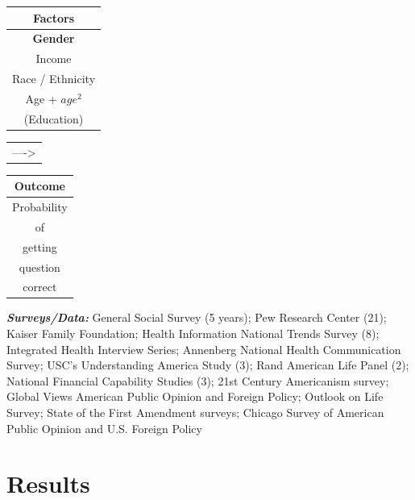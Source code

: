 \documentclass[]{article}
\begin{document}
 \begin{table}[ht]
 \centering
     \begin{tabular}{c}  %
       \hline   %
       Factors          \\
       \hline   %
       \textbf{Gender}           \\
       Income           \\
       Race / Ethnicity \\
       Age + $age^2$    \\
       (Education)        \\
       \hline  %
     \end{tabular}
     \begin{tabular}{l}  %
       ---->
     \end{tabular}
     \begin{tabular}{c}  %
        \hline   %
        Outcome        \\
        \hline   %
        Probability      \\
        of     \\
        getting \\
        question     \\
        correct          \\
        \hline  %
      \end{tabular}
 \end{table}

\vspace{7mm}

 \emph{\textbf{Surveys/Data:}} \footnotesize{General Social Survey (5 years); Pew Research Center (21); Kaiser Family Foundation; Health Information National Trends Survey (8); Integrated Health Interview Series; Annenberg National Health Communication Survey; USC's Understanding America Study (3); Rand American Life Panel (2); National Financial Capability Studies (3); 21st Century Americanism survey; Global Views American Public Opinion and Foreign Policy; Outlook on Life Survey; State of the First Amendment surveys; Chicago Survey of American Public Opinion and U.S. Foreign Policy}

\newpage
\section{Results}\label{Results}
\end{document}
